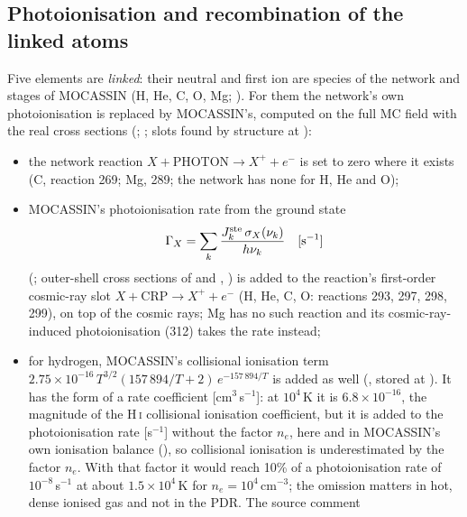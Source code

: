 \subsection{Photoionisation and recombination of the linked atoms}
\label{sec:linked}

Five elements are \emph{linked}: their neutral and first ion are species of
the network and stages of MOCASSIN (H, He, C, O, Mg;
). For them the network's own photoionisation is
replaced by MOCASSIN's, computed on the full MC field with the real cross
sections (; ; slots found by structure
at ):
\begin{itemize}
\item the network reaction $X+\mathrm{PHOTON}\to X^++e^-$ is set to zero where it
  exists (C, reaction 269; Mg, 289; the network has none for H, He and O);
\item MOCASSIN's photoionisation rate from the ground state
  \begin{equation}
    \Gamma_X = \sum_k \frac{J^{\mathrm{ste}}_k\,\sigma_X(\nu_k)}{h\nu_k}\quad[\mathrm{s^{-1}}]
    \label{eq:gammaX}
  \end{equation}
  (; outer-shell cross sections of
  \citealt{Verner1996} and \citealt{VernerYakovlev1995}, )
  is added to the reaction's first-order cosmic-ray slot $X+\mathrm{CRP}\to X^++e^-$
  (H, He, C, O: reactions 293, 297, 298, 299), on top of the cosmic rays; Mg has
  no such reaction and its cosmic-ray-induced photoionisation (312) takes the
  rate instead;
\item for hydrogen, MOCASSIN's collisional ionisation term
  $2.75\times10^{-16}\,T^{3/2}(157\,894/T+2)\,e^{-157\,894/T}$ is added as well
  (, stored at ). It has the form of a
  rate coefficient [cm$^3$\,s$^{-1}$]: at $10^4$\,K it is $6.8\times10^{-16}$, the
  magnitude of the H\,\textsc{i} collisional ionisation coefficient, but it is added
  to the photoionisation rate [s$^{-1}$] without the factor $n_e$, here and in
  MOCASSIN's own ionisation balance (), so collisional
  ionisation is underestimated by the factor $n_e$. With that factor it would
  reach 10\% of a photoionisation rate of $10^{-8}$\,s$^{-1}$ at about
  $1.5\times10^4$\,K for $n_e=10^4$\,cm$^{-3}$; the omission matters in hot, dense
  ionised gas and not in the PDR. The source comment

\end{itemize}
